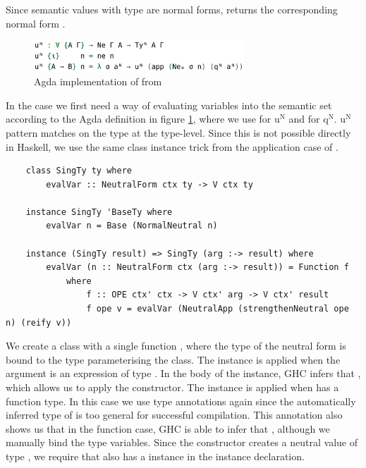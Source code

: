 Since semantic values with type  are normal forms,  returns the corresponding normal form .

\begin{figure}[h]
    \centering
    \includegraphics[width=0.7\textwidth]{./images/agda_eval_var.png}
    \caption{Agda implementation of  from \cite{AgdaNbe}}
    \label{fig:agdaEvalVar}
\end{figure}

In the  case we first need a way of evaluating variables into the semantic set according to the Agda definition in figure \ref{fig:agdaEvalVar}, where we use  for $\text{u}^\text{N}$ and  for $\text{q}^\text{N}$. $\text{u}^\text{N}$ pattern matches on the type  at the type-level. Since this is not possible directly in Haskell, we use the same class instance trick from the application case of . 

\begin{lstlisting}
    class SingTy ty where
        evalVar :: NeutralForm ctx ty -> V ctx ty

    instance SingTy 'BaseTy where
        evalVar n = Base (NormalNeutral n)

    instance (SingTy result) => SingTy (arg :-> result) where
        evalVar (n :: NeutralForm ctx (arg :-> result)) = Function f 
            where
                f :: OPE ctx' ctx -> V ctx' arg -> V ctx' result
                f ope v = evalVar (NeutralApp (strengthenNeutral ope n) (reify v))  
\end{lstlisting}

We create a class  with a single function , where the type of the neutral form is bound to the type  parameterising the class. The  instance is applied when the argument  is an expression of type . In the body of the instance, GHC infers that , which allows us to apply the  constructor. The \code{:->} instance is applied when  has a function type. In this case we use type annotations again since the automatically inferred type of  is too general for successful compilation. This annotation also shows us that in the function case, GHC is able to infer that , although we manually bind the type variables. Since the  constructor creates a neutral value of type , we require that  also has a  instance in the instance declaration.

